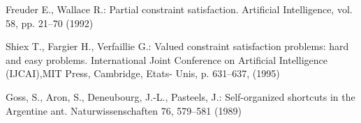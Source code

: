 \documentclass{llncs}
\begin{document}
\begin{thebibliography}{1}
	  Freuder E., Wallace R.: 
	  Partial constraint satisfaction.
	  Artificial Intelligence, vol. 58, pp. 21–70 (1992)
	  
	 Shiex T., Fargier H., Verfaillie G.:
	 Valued constraint satisfaction problems: hard and easy problems. 
	 International Joint Conference on Artificial Intelligence (IJCAI),MIT Press, Cambridge, Etats-
	 Unis, p. 631–637, (1995)
	
	 Goss, S., Aron, S., Deneubourg, J.-L., Pasteels, J.: 
	 Self-organized shortcuts in the Argentine ant. 
	 Naturwissenschaften 76, 579–581 (1989)
      
      
  \end{thebibliography}
\end{document}
